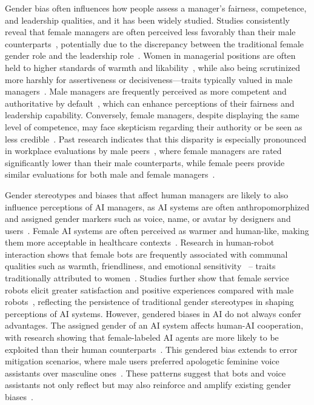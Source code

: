 \documentclass{article}
\begin{document}
Gender bias often influences how people assess a manager's fairness, competence, and leadership qualities, and it has been widely studied. 
Studies consistently reveal that female managers are often perceived less favorably than their male counterparts~\cite{heilman1995sex, heilman2001description, koch2015meta, braun2017think}, potentially due to the discrepancy between the traditional female gender role and the leadership role~\cite{elsesser2011does, eagly2002role}.
Women in managerial positions are often held to higher standards of warmth and likability~\cite{ridgeway2001gender}, while also being scrutinized more harshly for assertiveness or decisiveness—traits typically valued in male managers~\cite{rudman2008backlash}. Male managers are frequently perceived as more competent and authoritative by default~\cite{schein1996think, powell2002gender}, which can enhance perceptions of their fairness and leadership capability. Conversely, female managers, despite displaying the same level of competence, may face skepticism regarding their authority or be seen as less credible~\cite{eagly2002role}. 
Past research indicates that this disparity is especially pronounced in workplace evaluations by male peers~\cite{szymanska2018gender}, where female managers are rated significantly lower than their male counterparts, while female peers provide similar evaluations for both male and female managers~\cite{szymanska2018gender}. 

Gender stereotypes and biases that affect human managers are likely to also influence perceptions of AI managers, as AI systems are often anthropomorphized and assigned gender markers such as voice, name, or avatar by designers and users~\cite{craiut2022technology, wong2023chatgpt}.
Female AI systems are often perceived as warmer and human-like, making them more acceptable in healthcare contexts~\cite{borau2021most}.
Research in human-robot interaction shows that female bots are frequently associated with communal qualities such as warmth, friendliness, and emotional sensitivity~\cite{gustavsson2005virtual, eyssel2012s, otterbacher2017s, stroessner2019social, borau2021most} -- traits traditionally attributed to women~\cite{eagly1984gender, ebert2014warm}.
Studies further show that female service robots elicit greater satisfaction and positive experiences compared with male robots~\cite{seo2022female}, reflecting the persistence of traditional gender stereotypes in shaping perceptions of AI systems. 
However, gendered biases in AI do not always confer advantages.  
The assigned gender of an AI system affects human-AI cooperation, with research showing that female-labeled AI agents are more likely to be exploited than their human counterparts~\cite{bazazi2024ai}. 
This gendered bias extends to error mitigation scenarios, where male users preferred apologetic feminine voice assistants over masculine ones~\cite{mahmood2024gender}.  
These patterns suggest that bots and voice assistants not only reflect but may also reinforce and amplify existing gender biases~\cite{kiron2023workforce}.  
\end{document}
